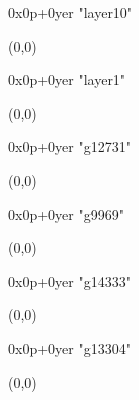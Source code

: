    0x0p+0yer "layer10"
  \begin{textblock}{1}(0,0)
  \end{textblock}

   0x0p+0yer "layer1"
  \begin{textblock}{1}(0,0)
  \end{textblock}

   0x0p+0yer "g12731"
  \begin{textblock}{1}(0,0)
  \end{textblock}

   0x0p+0yer "g9969"
  \begin{textblock}{1}(0,0)
  \end{textblock}

   0x0p+0yer "g14333"
  \begin{textblock}{1}(0,0)
  \end{textblock}

   0x0p+0yer "g13304"
  \begin{textblock}{1}(0,0)
  \end{textblock}
